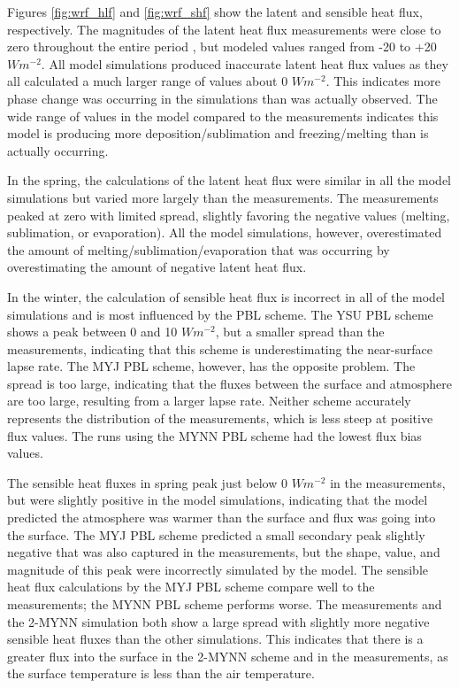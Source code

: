 Figures \ref{fig:wrf_hlf} and \ref{fig:wrf_shf} show the latent and sensible heat flux, respectively. The magnitudes of the latent heat flux measurements were close to zero throughout the entire period \citep{walden:2017}, but modeled values ranged from -20 to +20 $Wm^{-2}$. All model simulations produced inaccurate latent heat flux values as they all calculated a much larger range of values about 0 $Wm^{-2}$. This indicates more phase change was occurring in the simulations than was actually observed. The wide range of values in the model compared to the measurements indicates this model is producing more deposition/sublimation and freezing/melting than is actually occurring. 

In the spring, the calculations of the latent heat flux were similar in all the model simulations but varied more largely than the measurements. The measurements peaked at zero with limited spread, slightly favoring the negative values (melting, sublimation, or evaporation). All the model simulations, however, overestimated the amount of melting/sublimation/evaporation that was occurring by overestimating the amount of negative latent heat flux. 

In the winter, the calculation of sensible heat flux is incorrect in all of the model simulations and is most influenced by the PBL scheme. The YSU PBL scheme shows a peak between 0 and 10 $Wm^{-2}$, but a smaller spread than the measurements, indicating that this scheme is underestimating the near-surface lapse rate. The MYJ PBL scheme, however, has the opposite problem. The spread is too large, indicating that the fluxes between the surface and atmosphere are too large, resulting from a larger lapse rate. Neither scheme accurately represents the distribution of the measurements, which is less steep at positive flux values. The runs using the MYNN PBL scheme had the lowest flux bias values.

The sensible heat fluxes in spring peak just below 0 $Wm^{-2}$ in the measurements, but were slightly positive in the model simulations, indicating that the model predicted the atmosphere was warmer than the surface and flux was going into the surface. The MYJ PBL scheme predicted a small secondary peak slightly negative that was also captured in the measurements, but the shape, value, and magnitude of this peak were incorrectly simulated by the model. The sensible heat flux calculations by the MYJ PBL scheme compare well to the measurements; the MYNN PBL scheme performs worse. The measurements and the 2-MYNN simulation both show a large spread with slightly more negative sensible heat fluxes than the other simulations. This indicates that there is a greater flux into the surface in the 2-MYNN scheme and in the measurements, as the surface temperature is less than the air temperature.

